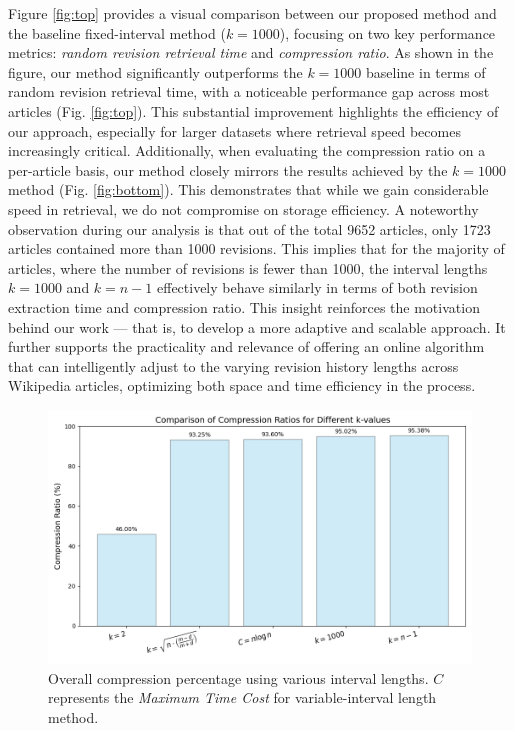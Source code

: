 \documentclass[acmsmall]{acmart}
\begin{document}
Figure \ref{fig:top} provides a visual comparison between our proposed method and the baseline fixed-interval method ($k=1000$), focusing on two key performance metrics: \emph{random revision retrieval time} and \emph{compression ratio}. As shown in the figure, our method significantly outperforms the $k=1000$ baseline in terms of random revision retrieval time, with a noticeable performance gap across most articles (Fig. \ref{fig:top}). This substantial improvement highlights the efficiency of our approach, especially for larger datasets where retrieval speed becomes increasingly critical.
Additionally, when evaluating the compression ratio on a per-article basis, our method closely mirrors the results achieved by the $k=1000$ method (Fig. \ref{fig:bottom}). This demonstrates that while we gain considerable speed in retrieval, we do not compromise on storage efficiency. A noteworthy observation during our analysis is that out of the total 9652 articles, only 1723 articles contained more than 1000 revisions. This implies that for the majority of articles, where the number of revisions is fewer than 1000, the interval lengths $k=1000$ and $k=n-1$ effectively behave similarly in terms of both revision extraction time and compression ratio. This insight reinforces the motivation behind our work — that is, to develop a more adaptive and scalable approach. It further supports the practicality and relevance of offering an online algorithm that can intelligently adjust to the varying revision history lengths across Wikipedia articles, optimizing both space and time efficiency in the process. 


\begin{figure}
  \centering
  \includegraphics[width=1\linewidth]{overall_compression.png}
  \caption{Overall compression percentage using various interval lengths. $C$ represents the \emph{Maximum Time Cost} for variable-interval length method.}
  \label{fig:over_compre}
\end{figure}
\end{document}
